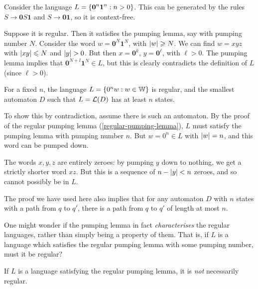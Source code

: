 \documentclass{article}
\begin{document}
\begin{prf}
	Consider the language $L = \left\lbrace \textbf{0}^n \textbf{1}^n : n > 0 \right\rbrace$. This can be generated by the rules $S \to \textbf{0}S\textbf{1}$ and $S \to \textbf{01}$, so it is context-free.
	    
	Suppose it is regular. Then it satisfies the pumping lemma, say with pumping number $N$. Consider the word $w = \textbf{0}^N \textbf{1}^N$, with $\left\lvert w \right\rvert \geqslant N$. We can find $w = xyz$ with $\left\lvert xy \right\rvert \leqslant N$ and $\left\lvert y \right\rvert > 0$. But then $x = \textbf{0}^k$, $y = \textbf{0}^\ell$, with $\ell > 0$. The pumping lemma implies that $\textbf{0}^{N+l}\textbf{1}^N \in L$, but this is clearly contradicts the definition of $L$ (since $\ell > 0$).
\end{prf}

\begin{example}
	For a fixed $n$, the language $L = \left\lbrace 0^n w : w \in \mathbb{W} \right\rbrace$ is regular, and the smallest automaton $D$ such that $L = \mathcal{L}(D)$ has at least $n$ states.
	    
	To show this by contradiction, assume there is such an automaton. By the proof of the regular pumping lemma (\ref{regular-pumping-lemma}), $L$ must satisfy the pumping lemma with pumping number $n$. But $w = 0^n \in L$ with $\left\lvert w \right\rvert = n$, and this word can be pumped down.
	    
	The words $x, y, z$ are entirely zeroes: by pumping $y$ down to nothing, we get a strictly shorter word $xz$. But this is a sequence of $n - \left\lvert y \right\rvert < n$ zeroes, and so cannot possibly be in $L$.
\end{example}

\begin{corollary}
	The proof we have used here also implies that for any automaton $D$ with $n$ states with a path from $q$ to $q'$, there is a path from $q$ to $q'$ of length at most $n$.
\end{corollary}

One might wonder if the pumping lemma in fact \textit{characterises} the regular languages, rather than simply being a property of them. That is, if $L$ is a language which satisfies the regular pumping lemma with some pumping number, must it be regular?

\begin{proposition}
	If $L$ is a language satisfying the regular pumping lemma, it is \textit{not} necessarily regular.
\end{proposition}
\end{document}

